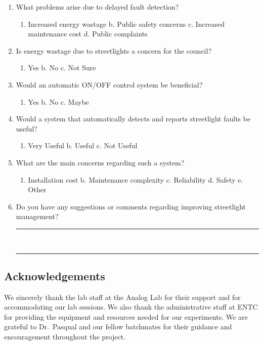 \documentclass[12pt,a4paper]{article}
\begin{document}
\begin{enumerate}
    \item What problems arise due to delayed fault detection?
    \begin{enumerate}[label=\alph*.]
        \item Increased energy wastage \quad b. Public safety concerns \quad c. Increased maintenance cost \quad d. Public complaints
    \end{enumerate}

    \item Is energy wastage due to streetlights a concern for the council?
    \begin{enumerate}[label=\alph*.]
        \item Yes \quad b. No \quad c. Not Sure
    \end{enumerate}

    \item Would an automatic ON/OFF control system be beneficial?
    \begin{enumerate}[label=\alph*.]
        \item Yes \quad b. No \quad c. Maybe
    \end{enumerate}

    \item Would a system that automatically detects and reports streetlight faults be useful?
    \begin{enumerate}[label=\alph*.]
        \item Very Useful \quad b. Useful \quad c. Not Useful
    \end{enumerate}

    \item What are the main concerns regarding such a system?
    \begin{enumerate}[label=\alph*.]
        \item Installation cost \quad b. Maintenance complexity \quad c. Reliability \quad d. Safety \quad e. Other
    \end{enumerate}

    \item Do you have any suggestions or comments regarding improving streetlight management?\\
    \rule{\linewidth}{0.4pt}\\
    \rule{\linewidth}{0.4pt}
\end{enumerate}

\subsection{Acknowledgements}

We sincerely thank the lab staff at the Analog Lab for their support and for accommodating our lab sessions. We also thank the administrative staff at ENTC for providing the equipment and resources needed for our experiments. We are grateful to Dr.\ Pasqual and our fellow batchmates for their guidance and encouragement throughout the project.
\end{document}
